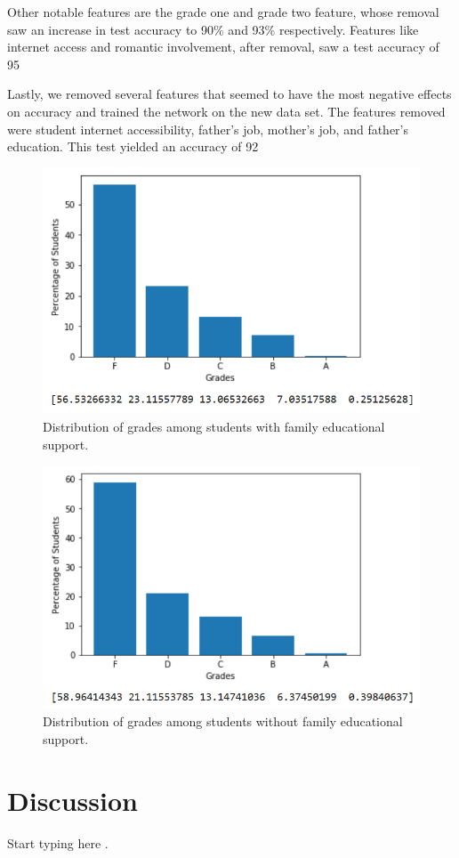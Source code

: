 \documentclass[conference]{IEEEtran}
\begin{document}
Other notable features are the grade one and grade two feature, whose removal saw an increase in test accuracy to 90\% and 93\% respectively. Features like internet access and romantic involvement, after removal, saw a test accuracy of 95%

Lastly, we removed several features that seemed to have the most negative effects on accuracy and trained the network on the new data set. The features removed were student internet accessibility, father’s job, mother’s job, and father’s education. This test yielded an accuracy of 92%

\begin{figure}[htbp]
\centerline{\includegraphics[width=\linewidth]{fam.png}}
\caption{Distribution of grades among students with family educational support.}
\label{fam}
\end{figure}

\begin{figure}[htbp]
\centerline{\includegraphics[width=\linewidth]{nofam.png}}
\caption{Distribution of grades among students without family educational support.}
\label{fam}
\end{figure}

\section{Discussion}

Start typing here \cite{b5}.


\end{document}
